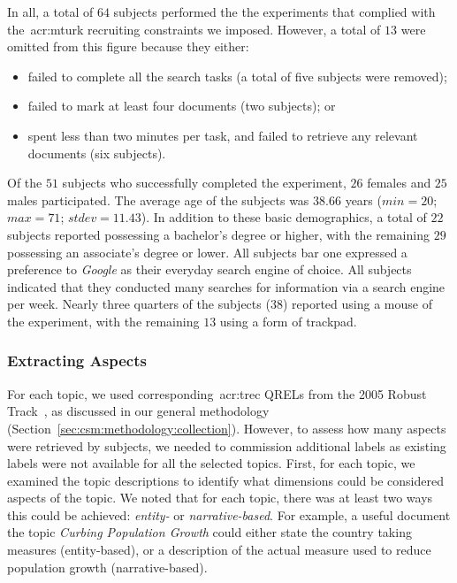 In all, a total of $64$ subjects performed the the experiments that complied with the~\gls{acr:mturk} recruiting constraints we imposed. However, a total of $13$ were omitted from this figure because they either:

\begin{itemize}
    \item{failed to complete all the search tasks (a total of five subjects were removed);}
    \item{failed to mark at least four documents (two subjects); or}
    \item{spent less than two minutes per task, and failed to retrieve any relevant documents (six subjects).}
\end{itemize}

Of the $51$ subjects who successfully completed the experiment, $26$ females and $25$ males participated. The average age of the subjects was $38.66$ years ($min=20$; $max=71$; $stdev=11.43$). In addition to these basic demographics, a total of $22$ subjects reported possessing a bachelor's degree or higher, with the remaining $29$ possessing an associate's degree or lower. All subjects bar one expressed a preference to \emph{Google} as their everyday search engine of choice. All subjects indicated that they conducted many searches for information via a search engine per week. Nearly three quarters of the subjects ($38$) reported using a mouse of the experiment, with the remaining $13$ using a form of trackpad.

\subsubsection{Extracting Aspects}\label{sec:diversity:users:method:aspects}
For each topic, we used corresponding~\gls{acr:trec} QRELs from the 2005 Robust Track~\citep{voorhees2006trec_robust}, as discussed in our general methodology (Section~\ref{sec:csm:methodology:collection}). However, to assess how many aspects were retrieved by subjects, we needed to commission additional labels as existing labels were not available for all the selected topics. First, for each topic, we examined the topic descriptions to identify what dimensions could be considered aspects of the topic. We noted that for each topic, there was at least two ways this could be achieved: \emph{entity-} or \emph{narrative-based}. For example, a useful document the topic \emph{Curbing Population Growth} could either state the country taking measures (entity-based), or a description of the actual measure used to reduce population growth (narrative-based).

